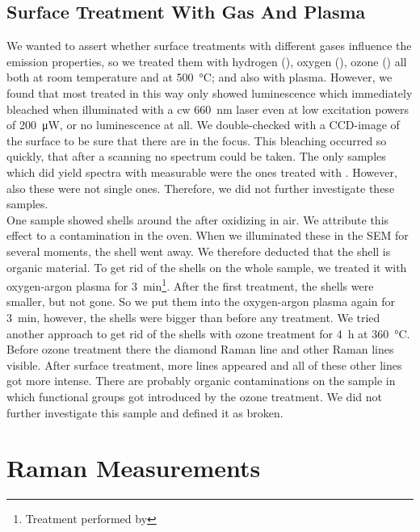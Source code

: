 			\subsection{Surface Treatment With Gas And Plasma}\label{subsection::plasma}

				We wanted to assert whether surface treatments with different gases influence the emission properties, so we treated them with hydrogen (), oxygen (), ozone () all both at room temperature and at \SI{500}{\celsius}; and also with  plasma.
				However, we found that most \nds treated in this way only showed luminescence which immediately bleached when illuminated with a cw \SI{660}{nm} laser even at low excitation powers of \SI{200}{\micro\watt}, or no luminescence at all.
				We double-checked with a CCD-image of the surface to be sure that there are \nds in the focus.
				This bleaching occurred so quickly, that after a scanning no spectrum could be taken.
				The only samples which did yield spectra with measurable \ZPLs were the ones treated with .
				However, also these \sivs were not single ones.
				Therefore, we did not further investigate these samples.
				\\
				One sample showed shells around the \nd after oxidizing in air.
				We attribute this effect to a contamination in the oven.
				When we illuminated these \nds in the SEM for several moments, the shell went away.
				We therefore deducted that the shell is organic material.
				To get rid of the shells on the whole sample, we treated it with oxygen-argon plasma for \SI{3}{min}\footnote{Treatment performed by \schmauch}.
				After the first treatment, the shells were smaller, but not gone.
				So we put them into the oxygen-argon plasma again for \SI{3}{min}, however, the shells were bigger than before any treatment.
				We tried another approach to get rid of the shells with ozone treatment for \SI{4}{\hour} at \SI{360}{\celsius}.
				Before ozone treatment there the diamond Raman line and other Raman lines visible.
				After surface treatment, more lines appeared and all of these other lines got more intense.
				There are probably organic contaminations on the sample in which functional groups got introduced by the ozone treatment.
				We did not further investigate this sample and defined it as broken.

		\section{Raman Measurements}

